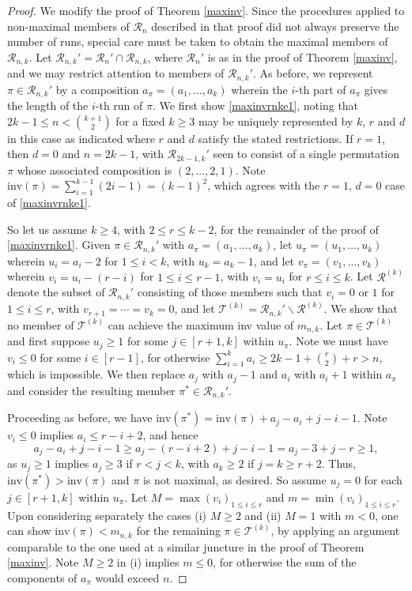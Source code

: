 \documentclass[11pt,a4paper]{article}
\begin{document}
\begin{proof}
We modify the proof of Theorem \ref{maxinv}.  Since the procedures applied to non-maximal members of $\mathcal{R}_n$ described in that proof did not always preserve the number of runs, special care must be taken to obtain the maximal members of $\mathcal{R}_{n,k}$.  Let $\mathcal{R}_{n,k}'=\mathcal{R}_n'\cap \mathcal{R}_{n,k}$, where $\mathcal{R}_{n}'$ is as in the proof of Theorem \ref{maxinv}, and we may restrict attention to members of $\mathcal{R}_{n,k}'$.  As before, we represent $\pi \in \mathcal{R}_{n,k}'$ by a composition $a_\pi=(a_1,\ldots,a_k)$ wherein the $i$-th part of $a_\pi$ gives the length of the $i$-th run of $\pi$.  We first show \eqref{maxinvrnke1}, noting that $2k-1 \leq n <\binom{k+1}{2}$ for a fixed $k \geq 3$ may be uniquely represented by $k$, $r$ and $d$ in this case as indicated where $r$ and $d$ satisfy the stated restrictions.  If $r=1$, then $d=0$ and $n=2k-1$, with  $\mathcal{R}_{2k-1,k}'$ seen to consist of a single permutation $\pi$ whose associated composition is $(2,\ldots,2,1)$.  Note $\text{inv}(\pi)=\sum_{i=1}^{k-1}(2i-1)=(k-1)^2$, which agrees with the $r=1,\,d=0$ case of \eqref{maxinvrnke1}.

So let us assume $k \geq 4$, with $2 \leq r \leq k-2$, for the remainder of the proof of \eqref{maxinvrnke1}. Given $\pi \in \mathcal{R}_{n,k}'$ with $a_\pi=(a_1,\ldots,a_k)$, let $u_\pi=(u_1,\ldots,u_k)$ wherein $u_i=a_i-2$ for $1 \leq i < k$, with $u_k=a_k-1$, and let $v_\pi=(v_1,\ldots,v_k)$ wherein $v_i=u_i-(r-i)$ for $1 \leq i \leq r-1$, with $v_i=u_i$ for $r \leq i \leq k$.  Let $\mathcal{R}^{(k)}$ denote the subset of $\mathcal{R}_{n,k}'$ consisting of those members such that $v_i=0$ or $1$ for $1 \leq i \leq r$, with $v_{r+1}=\cdots=v_k=0$, and let $\mathcal{T}^{(k)}=\mathcal{R}_{n,k}'\backslash \mathcal{R}^{(k)}$.  We show that no member of $\mathcal{T}^{(k)}$ can achieve the maximum inv value of $m_{n,k}$. Let $\pi \in \mathcal{T}^{(k)}$ and first suppose $u_j \geq 1$ for some $j \in [r+1,k]$ within $u_\pi$.  Note we must have $v_i \leq 0$ for some $i \in [r-1]$, for otherwise
$\sum_{i=1}^ka_i \geq 2k-1+\binom{r}{2}+r>n$, which is impossible.  We then replace $a_j$ with $a_j-1$ and $a_i$ with $a_i+1$ within $a_\pi$ and consider the resulting member $\pi^* \in \mathcal{R}_{n,k}'$.

Proceeding as before, we have $\text{inv}(\pi^*)=\text{inv}(\pi)+a_j-a_i+j-i-1$.  Note $v_i \leq 0$ implies $a_i \leq r-i+2$, and hence
$$a_j-a_i+j-i-1 \geq a_j-(r-i+2)+j-i-1=a_j-3+j-r \geq 1,$$
as $u_j \geq 1$ implies $a_j \geq 3$ if $r<j<k$, with $a_k \geq 2$ if $j=k \geq r+2$.  Thus, $\text{inv}(\pi^*)>\text{inv}(\pi)$ and $\pi$ is not maximal, as desired.  So assume $u_j=0$ for each $j \in [r+1,k]$ within $u_\pi$.  Let $M=\max(v_i)_{1 \leq i \leq r}$ and $m=\min(v_i)_{1 \leq i \leq r}$.   Upon considering separately the cases (i) $M \geq 2$ and (ii) $M=1$ with $m<0$, one can show $\text{inv}(\pi)<m_{n,k}$ for the remaining $\pi \in \mathcal{T}^{(k)}$, by applying an argument comparable to the one used at a similar juncture in the proof of Theorem \ref{maxinv}.  Note $M \geq 2$ in (i) implies $m \leq 0$, for otherwise the sum of the components of $a_\pi$ would exceed $n$.


\end{proof}
\end{document}
